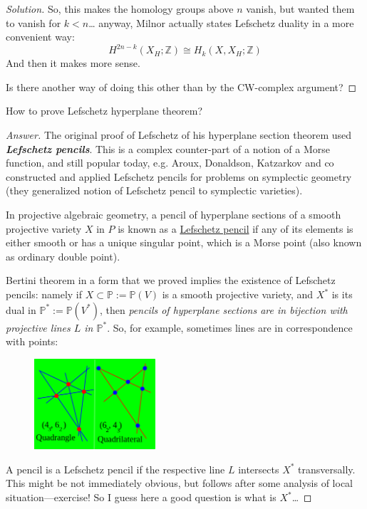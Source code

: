 \documentclass{article}
\newcommand{\Z}{\mathbb{Z}}
\renewcommand{\P}{\mathbb{P}}
\begin{document}
\begin{proof}[Solution]
So, this makes the homology groups above $n$ vanish, but wanted them to vanish for $k<n$… anyway, Milnor actually states Lefschetz duality in a more convenient way:
\begin{equation*}
	H^{2n-k}(X_H;\Z)\cong H_{k}(X,X_H;\Z)
\end{equation*}
And then it makes more sense.

Is there another way of doing this other than by the CW-complex argument?
\end{proof}


\begin{question}[]
	How to prove Lefschetz hyperplane theorem?
\end{question}
\begin{proof}[Answer]
	The original proof of Lefschetz of his hyperplane section theorem used \textit{\textbf{Lefschetz pencils}}. This is a complex counter-part of a notion of a Morse function, and still popular today, e.g. Aroux, Donaldson, Katzarkov and co constructed and applied Lefschetz pencils for problems on symplectic geometry (they generalized notion of Lefschetz pencil to symplectic varieties).

	In projective algebraic geometry, a pencil of hyperplane sections of a smooth projective variety $X$ in $P$ is known as a \href{https://en.wikipedia.org/wiki/Lefschetz_pencil}{Lefschetz pencil} if any of its elements is either smooth or has a unique singular point, which is a Morse point (also known as ordinary double point).

	Bertini theorem in a form that we proved implies the existence of Lefschetz pencils: namely if $X\subset \P:=\P(V)$ is a smooth projective variety, and $X^*$ is its dual in $\P^*:=\P(V^*)$, then \textit{pencils of hyperplane sections are in bijection with projective lines $L$ in $\P^*$}. {\color{cyan}So, for example, sometimes lines are in correspondence with points:}
	\begin{figure}[H]
		\centering
		\includegraphics[width=0.4\textwidth]{duality}
	\end{figure}	
	A pencil is a Lefschetz pencil if the respective line $L$ intersects $X^*$ transversally. {\color{azure}This might be not immediately obvious, but follows after some analysis of local situation---exercise!} {\color{magenta}So I guess here a good question is what is $X^*$…} 


\end{proof}
\end{document}
